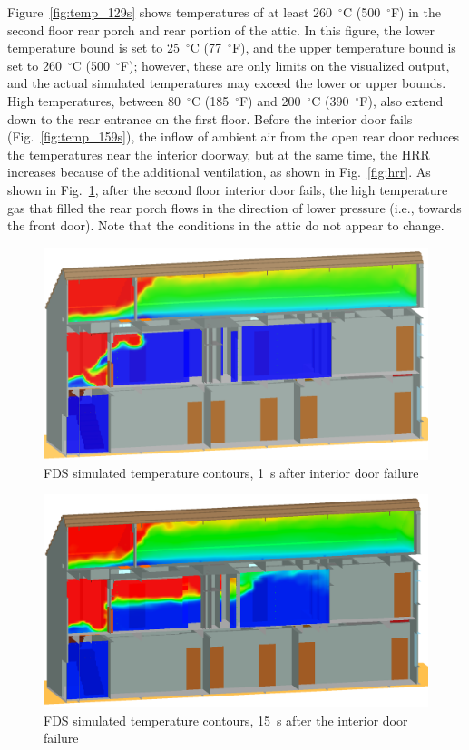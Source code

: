 Figure~\ref{fig:temp_129s} shows temperatures of at least 260~$^{\circ}$C (500~$^{\circ}$F) in the second floor rear porch and rear portion of the attic. In this figure, the lower temperature bound is set to 25~$^{\circ}$C (77~$^{\circ}$F), and the upper temperature bound is set to 260~$^{\circ}$C (500~$^{\circ}$F); however, these are only limits on the visualized output, and the actual simulated temperatures may exceed the lower or upper bounds. High temperatures, between 80~$^{\circ}$C (185~$^{\circ}$F) and 200~$^{\circ}$C (390~$^{\circ}$F), also extend down to the rear entrance on the first floor. Before the interior door fails (Fig.~\ref{fig:temp_159s}), the inflow of ambient air from the open rear door reduces the temperatures near the interior doorway, but at the same time, the HRR increases because of the additional ventilation, as shown in Fig.~\ref{fig:hrr}. As shown in Fig.~\ref{fig:temp_161s}, after the second floor interior door fails, the high temperature gas that filled the rear porch flows in the direction of lower pressure (i.e., towards the front door). Note that the conditions in the attic do not appear to change.
\begin{figure}[!ht]
\includegraphics[width=.675\textwidth]{../Figures/west_50th_baseline_161}
 

\caption{FDS simulated temperature contours, 1~s after interior door failure}
\label{fig:temp_161s}
\end{figure}

\begin{figure}[!ht]
\includegraphics[width=.675\textwidth]{../Figures/west_50th_baseline_175}
 

\caption{FDS simulated temperature contours, 15~s after the interior door failure}
\label{fig:temp_175s}
\end{figure}


